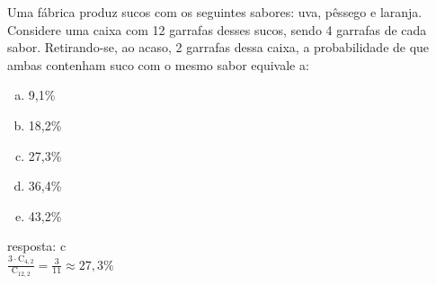 \begin{ex}
 	Uma fábrica produz sucos com os seguintes sabores: uva, pêssego e laranja. Considere uma caixa com 12 garrafas desses sucos, sendo 4 garrafas de cada sabor.
Retirando-se, ao acaso, 2 garrafas dessa caixa, a probabilidade de que ambas contenham suco com o mesmo sabor equivale a:
    \begin{enumerate}[(a)]
    \item 9,1\%
    \item 18,2\%
    \item 27,3\%
    \item 36,4\%
    \item 43,2\%
    \end{enumerate}
      \begin{sol}
       resposta: c \\
      $\frac{3\cdot\mathrm{C}_{4,2}}{\mathrm{C}_{{12},2}}=\frac{3}{11}\approx27,3\%$
      \end{sol}
\end{ex}